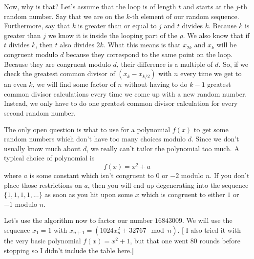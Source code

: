 \documentclass[12pt]{article}
\begin{document}
Now, why is that? Let's assume that the loop is of length $t$ and
starts at the $j$-th random number.  Say that we are on the $k$-th
element of our random sequence.  Furthermore, say that $k$ is
greater than or equal to $j$ and $t$ divides $k$.  Because $k$ is
greater than $j$ we know it is inside the looping part of the
$\rho$.  We also know that if $t$ divides $k$, then $t$ also divides
$2k$.  What this means is that $x_{2k}$ and $x_k$ will be congruent
modulo $d$ because they correspond to the same point on the loop.
Because they are congruent modulo $d$, their difference is a multiple
of $d$.  So, if we check the greatest common divisor of $(x_k-x_{k/2})$
with $n$ every time we get to an even $k$, we will find some factor
of $n$ without having to do $k-1$ greatest common divisor calculations
every time we come up with a new random number.  Instead, we only
have to do one greatest common divisor calculation for every second
random number.

The only open question is what to use for a polynomial
$f(x)$ to get some random numbers which don't have too
many choices modulo $d$.  Since we don't usually know
much about $d$, we really can't tailor the polynomial
too much.  A typical choice of polynomial is 
$$f(x) = x^2 + a$$ where $a$ is
some constant which isn't congruent to $0$ or $-2$
modulo $n$.  If you don't place those restrictions on
$a$, then you will end up degenerating into the sequence
$\{ 1, 1, 1, 1, ... \}$ as soon as you hit upon some $x$
which is congruent to either $1$ or $-1$ modulo
$n$.

Let's use the algorithm now to factor our number $16843009$.  We
will use the sequence $x_1=1$ with $x_{n+1} = ( 1024x_n^2 + 32767
\mod n )$.  [ I also tried it with the very basic polynomial $f(x)
= x^2 + 1$, but that one went 80 rounds before stopping so I didn't
include the table here.]
\end{document}

